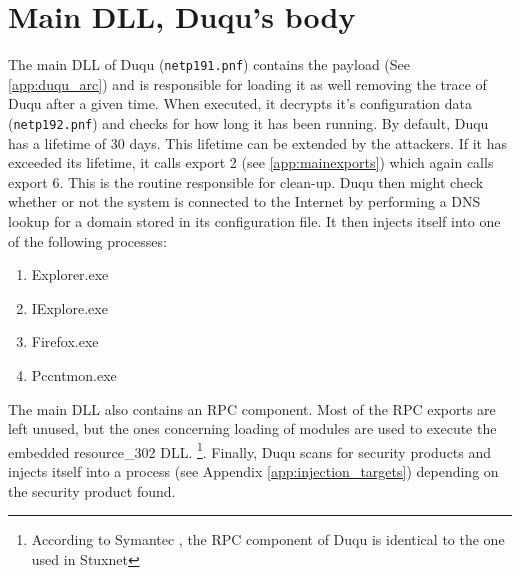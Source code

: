 \documentclass[11pt,english,a4paper]{report}
\begin{document}
\section{Main DLL, Duqu's body}
The main DLL of Duqu (\texttt{netp191.pnf}) contains the payload (See \ref{app:duqu_arc}) and is responsible for loading it as well removing the trace of Duqu after a given time. When executed, it decrypts it's configuration data (\texttt{netp192.pnf}) and checks for how long it has been running. By default, Duqu has a lifetime of 30 days. This lifetime can be extended by the attackers. If it has exceeded its lifetime, it calls export 2 (see \ref{app:mainexports}) which again calls export 6. This is the routine responsible for clean-up. Duqu then might check whether or not the system is connected to the Internet by performing a DNS lookup for a domain stored in its configuration file. It then injects itself into one of the following processes:
 \begin{enumerate}
   \item Explorer.exe
   \item IExplore.exe
   \item Firefox.exe
   \item Pccntmon.exe
  \end{enumerate}
The main DLL also contains an RPC component. Most of the RPC exports are left unused, but the ones concerning loading of modules are used to execute the embedded resource\_302 DLL. \footnote{ According to Symantec \cite{DUQU_SYMANTEC}, the RPC component of Duqu is identical to the one used in Stuxnet}. Finally, Duqu scans for security products and injects itself into a process (see Appendix \ref{app:injection_targets}) depending on the security product found. 
\end{document}
